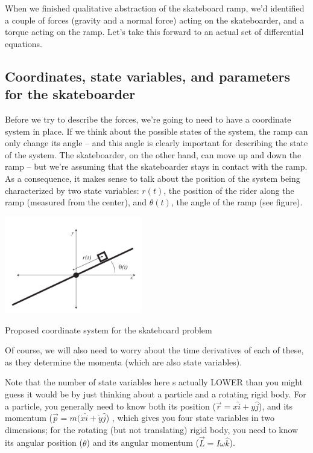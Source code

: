 When we finished qualitative abstraction of the skateboard ramp, we'd identified a couple of forces (gravity and a normal force) acting on the skateboarder, and a torque acting on the ramp.  Let's take this forward to an actual set of differential equations.

\subsection{Coordinates, state variables, and parameters for the skateboarder}

Before we try to describe the forces, we're going to need to have a coordinate system in place. If we think about the possible states of the system, the ramp can only change its angle -- and this angle is clearly important for describing the state of the system.  The skateboarder, on the other hand, can move up and down the ramp -- but we're assuming that the skateboarder stays in contact with the ramp.  As a consequence, it makes sense to talk about the position of the system being characterized by two state variables:  $r(t)$, the position of the rider along the ramp (measured from the center), and $\theta(t)$, the angle of the ramp (see figure).
\begin{marginfigure}
\includegraphics[width=6cm]{figs/SkateboardCoords}
\caption{Proposed coordinate system for the skateboard problem}
\end{marginfigure}

Of course, we will also need to worry about the time derivatives of each of these, as they determine the momenta (which are also state variables).

Note that the number of state variables here s actually LOWER than you might guess it would be by just thinking about a particle and a rotating rigid body.  For a particle, you generally need to know both its position ($\vec{r} = x \hat{i} + y \hat{j}$), and its momentum ($\vec{p} = m(\dot{x} \hat{i} + \dot{y} \hat{j}$) , which gives you four state variables in two dimensions; for the rotating (but not translating) rigid body, you need to know its angular position ($\theta$) and its angular momentum ($\vec{L} = I \omega \hat{k}$).  

